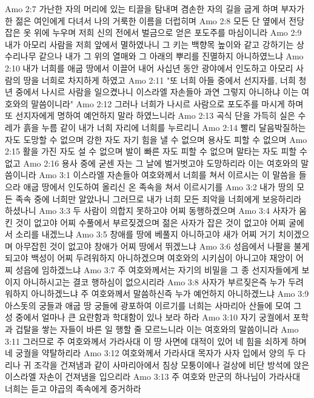 Amo 2:7  가난한 자의 머리에 있는 티끌을 탐내며 겸손한 자의 길을 굽게 하며 부자가 한 젊은 여인에게 다녀서 나의 거룩한 이름을 더럽히며
Amo 2:8  모든 단 옆에서 전당 잡은 옷 위에 누우며 저희 신의 전에서 벌금으로 얻은 포도주를 마심이니라
Amo 2:9  내가 아모리 사람을 저희 앞에서 멸하였나니 그 키는 백향목 높이와 같고 강하기는 상수리나무 같으나 내가 그 위의 열매와 그 아래의 뿌리를 진멸하지 아니하였느냐
Amo 2:10  내가 너희를 애굽 땅에서 이끌어 내어 사십년 동안 광야에서 인도하고 아모리 사람의 땅을 너희로 차지하게 하였고
Amo 2:11  "또 너희 아들 중에서 선지자를, 너희 청년 중에서 나시르 사람을 일으켰나니 이스라엘 자손들아 과연 그렇지 아니하냐 이는 여호와의 말씀이니라"
Amo 2:12  그러나 너희가 나시르 사람으로 포도주를 마시게 하며 또 선지자에게 명하여 예언하지 말라 하였느니라
Amo 2:13  곡식 단을 가득히 실은 수레가 흙을 누름 같이 내가 너희 자리에 너희를 누르리니
Amo 2:14  빨리 달음박질하는 자도 도망할 수 없으며 강한 자도 자기 힘을 낼 수 없으며 용사도 피할 수 없으며
Amo 2:15  활을 가진 자도 설 수 없으며 발이 빠른 자도 피할 수 없으며 말타는 자도 피할 수 없고
Amo 2:16  용사 중에 굳센 자는 그 날에 벌거벗고야 도망하리라 이는 여호와의 말씀이니라
Amo 3:1  이스라엘 자손들아 여호와께서 너희를 쳐서 이르시는 이 말씀을 들으라 애굽 땅에서 인도하여 올리신 온 족속을 쳐서 이르시기를
Amo 3:2  내가 땅의 모든 족속 중에 너희만 알았나니 그러므로 내가 너희 모든 죄악을 너희에게 보응하리라 하셨나니
Amo 3:3  두 사람이 의합지 못하고야 어찌 동행하겠으며
Amo 3:4  사자가 움킨 것이 없고야 어찌 수풀에서 부르짖겠으며 젊은 사자가 잡은 것이 없고야 어찌 굴에서 소리를 내겠느냐
Amo 3:5  창애를 땅에 베풀지 아니하고야 새가 어찌 거기 치이겠으며 아무잡힌 것이 없고야 창애가 어찌 땅에서 뛰겠느냐
Amo 3:6  성읍에서 나팔을 불게 되고야 백성이 어찌 두려워하지 아니하겠으며 여호와의 시키심이 아니고야 재앙이 어찌 성읍에 임하겠느냐
Amo 3:7  주 여호와께서는 자기의 비밀을 그 종 선지자들에게 보이지 아니하시고는 결코 행하심이 없으시리라
Amo 3:8  사자가 부르짖은즉 누가 두려워하지 아니하겠느냐 주 여호와께서 말씀하신즉 누가 예언하지 아니하겠느냐
Amo 3:9  아스돗의 궁들과 애굽 땅 궁들에 광포하여 이르기를 너희는 사마리아 산들에 모여 그 성 중에서 얼마나 큰 요란함과 학대함이 있나 보라 하라
Amo 3:10  자기 궁궐에서 포학과 겁탈을 쌓는 자들이 바른 일 행할 줄 모르느니라 이는 여호와의 말씀이니라
Amo 3:11  그러므로 주 여호와께서 가라사대 이 땅 사면에 대적이 있어 네 힘을 쇠하게 하며 네 궁궐을 약탈하리라
Amo 3:12  여호와께서 가라사대 목자가 사자 입에서 양의 두 다리나 귀 조각을 건져냄과 같이 사마리아에서 침상 모퉁이에나 걸상에 비단 방석에 앉은 이스라엘 자손이 건져냄을 입으리라
Amo 3:13  주 여호와 만군의 하나님이 가라사대 너희는 듣고 야곱의 족속에게 증거하라
